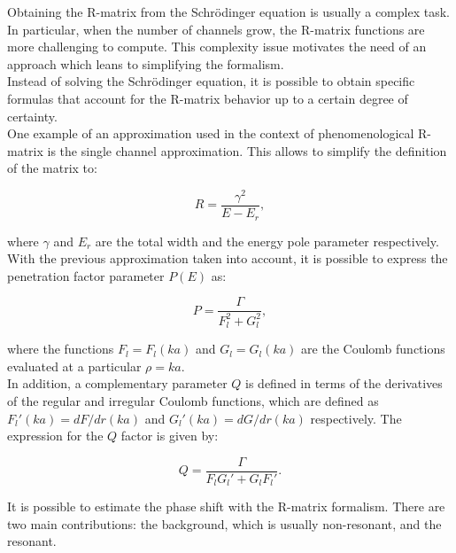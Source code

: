 \documentclass[openany]{book}
\begin{document}
Obtaining the R-matrix from the Schrödinger equation is usually a complex task. In particular, when the number of channels grow, the R-matrix functions are more challenging to compute. This complexity issue motivates the need of an approach which leans to simplifying the formalism.  \\

Instead of solving the Schrödinger equation, it is possible to obtain specific formulas that account for the R-matrix  behavior up to a certain degree of certainty.  \\

One example of an approximation used in the context of phenomenological R-matrix is the single channel approximation. This allows to simplify the definition of the matrix to: 

\begin{equation} \label{eq:rmatrix_simplified }
	R= \frac{\gamma^2}{E - E_r},
\end{equation}

where $\gamma$ and $E_r$ are the total width and the energy pole parameter respectively. \\

With the previous approximation taken into account, it is possible to express the penetration factor parameter $P(E)$ as:

\begin{equation} \label{eq:rmatrix_penetrationFactor_coulomb}
	P= \frac{\Gamma}{F_l^2 + G_l^2},
\end{equation}

where the functions $F_l = F_l(ka)$ and $G_l = G_l(ka)$ are the Coulomb functions evaluated at a particular $\rho = ka$. \\

In addition, a complementary parameter $Q$ is defined in terms of the derivatives of the regular and irregular Coulomb functions, which are defined as $F_l'(ka) = dF/dr(ka)$ and $G_l'(ka) = dG/dr(ka)$ respectively. The expression for the $Q$ factor is given by: 

\begin{equation} \label{eq:rmatrix_QFactor}
	Q = \frac{\Gamma}{F_lG_l' + G_lF_l'}.
\end{equation}

It is possible to estimate the phase shift with the R-matrix formalism. There are two main contributions: the background, which is usually non-resonant, and the resonant. \\
\end{document}
